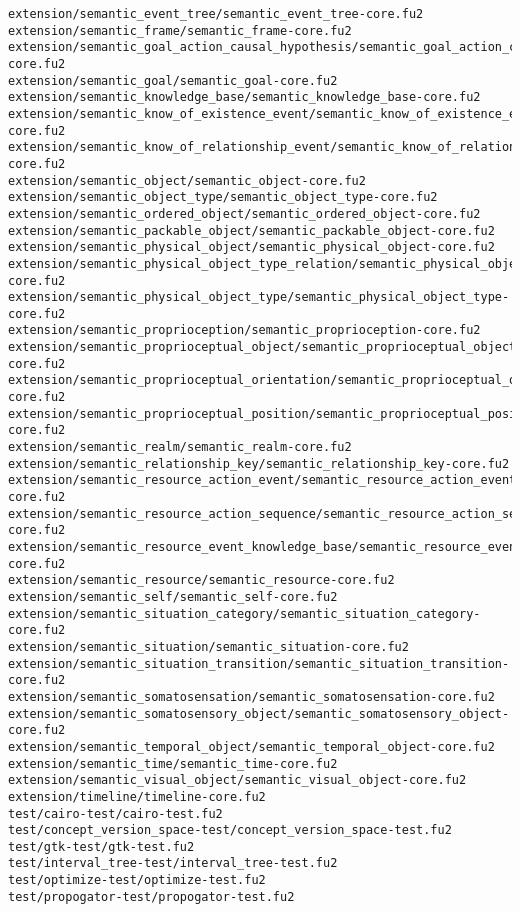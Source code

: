 \begin{lstlisting}
extension/semantic_event_tree/semantic_event_tree-core.fu2
extension/semantic_frame/semantic_frame-core.fu2
extension/semantic_goal_action_causal_hypothesis/semantic_goal_action_causal_hypothesis-core.fu2
extension/semantic_goal/semantic_goal-core.fu2
extension/semantic_knowledge_base/semantic_knowledge_base-core.fu2
extension/semantic_know_of_existence_event/semantic_know_of_existence_event-core.fu2
extension/semantic_know_of_relationship_event/semantic_know_of_relationship_event-core.fu2
extension/semantic_object/semantic_object-core.fu2
extension/semantic_object_type/semantic_object_type-core.fu2
extension/semantic_ordered_object/semantic_ordered_object-core.fu2
extension/semantic_packable_object/semantic_packable_object-core.fu2
extension/semantic_physical_object/semantic_physical_object-core.fu2
extension/semantic_physical_object_type_relation/semantic_physical_object_type_relation-core.fu2
extension/semantic_physical_object_type/semantic_physical_object_type-core.fu2
extension/semantic_proprioception/semantic_proprioception-core.fu2
extension/semantic_proprioceptual_object/semantic_proprioceptual_object-core.fu2
extension/semantic_proprioceptual_orientation/semantic_proprioceptual_orientation-core.fu2
extension/semantic_proprioceptual_position/semantic_proprioceptual_position-core.fu2
extension/semantic_realm/semantic_realm-core.fu2
extension/semantic_relationship_key/semantic_relationship_key-core.fu2
extension/semantic_resource_action_event/semantic_resource_action_event-core.fu2
extension/semantic_resource_action_sequence/semantic_resource_action_sequence-core.fu2
extension/semantic_resource_event_knowledge_base/semantic_resource_event_knowledge_base-core.fu2
extension/semantic_resource/semantic_resource-core.fu2
extension/semantic_self/semantic_self-core.fu2
extension/semantic_situation_category/semantic_situation_category-core.fu2
extension/semantic_situation/semantic_situation-core.fu2
extension/semantic_situation_transition/semantic_situation_transition-core.fu2
extension/semantic_somatosensation/semantic_somatosensation-core.fu2
extension/semantic_somatosensory_object/semantic_somatosensory_object-core.fu2
extension/semantic_temporal_object/semantic_temporal_object-core.fu2
extension/semantic_time/semantic_time-core.fu2
extension/semantic_visual_object/semantic_visual_object-core.fu2
extension/timeline/timeline-core.fu2
test/cairo-test/cairo-test.fu2
test/concept_version_space-test/concept_version_space-test.fu2
test/gtk-test/gtk-test.fu2
test/interval_tree-test/interval_tree-test.fu2
test/optimize-test/optimize-test.fu2
test/propogator-test/propogator-test.fu2

\end{lstlisting}
